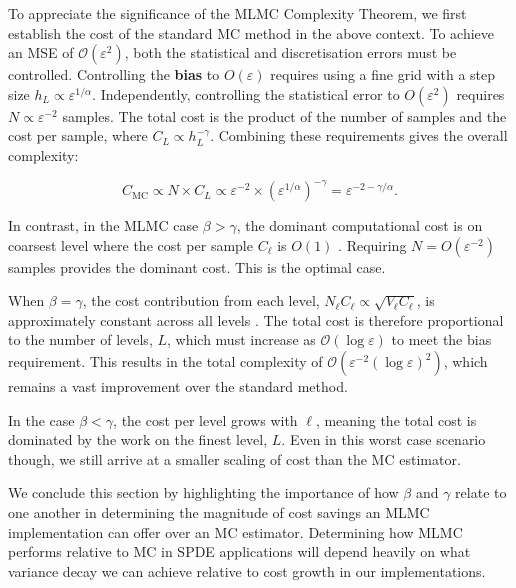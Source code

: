 To appreciate the significance of the MLMC Complexity Theorem, we first establish the cost of the 
standard MC method in the above context. To achieve an MSE of 
$\mathcal{O}(\varepsilon^2)$, both the statistical and discretisation errors must be controlled.
Controlling the \textbf{bias} to $O(\varepsilon)$ requires using a fine grid with a 
step size $h_L \propto \varepsilon^{1/\alpha}$. Independently, controlling the 
statistical error to $O(\varepsilon^2)$ requires 
$N \propto \varepsilon^{-2}$ samples. The total cost is the product of the number of 
samples and the cost per sample, where $C_L \propto h_L^{-\gamma}$. Combining these 
requirements gives the overall complexity:

$$
C_{\mathrm{MC}} \propto N \times C_L \propto \varepsilon^{-2} 
\times (\varepsilon^{1/\alpha})^{-\gamma} = \varepsilon^{-2-\gamma/\alpha}.
$$

In contrast, in the MLMC case $\beta > \gamma$, the dominant computational
cost is on coarsest level where the cost per sample $C_\ell$ is $O(1)$ 
\cite{giles2015multilevel}.
Requiring $N = O(\varepsilon^{-2})$ samples provides the dominant cost. This is the optimal 
case.

When $\beta = \gamma$, the cost contribution from each level, 
$N_\ell C_\ell \propto \sqrt{V_\ell C_\ell}$, is approximately constant across 
all levels \cite{giles2015multilevel}. The total cost is therefore proportional to the 
number of levels, $L$, which must increase as $\mathcal{O}(\log \varepsilon)$ to 
meet the bias requirement. This results in the total complexity of 
$\mathcal{O}(\varepsilon^{-2}(\log \varepsilon)^2)$, which remains a vast 
improvement over the standard method.

In the case $\beta < \gamma$, the cost per level grows with $\ell$, meaning 
the total cost is dominated by the work on the finest level, $L$. 
Even in this worst case scenario though, we still arrive at a smaller scaling of cost 
than the MC estimator. 

We conclude this section by highlighting the importance of how
$\beta$ and $\gamma$ relate to one another in determining the 
magnitude of cost savings an MLMC implementation can offer over an 
MC estimator. Determining how MLMC performs relative to MC in SPDE
applications will depend heavily on what variance decay we can achieve
relative to cost growth in our implementations.
